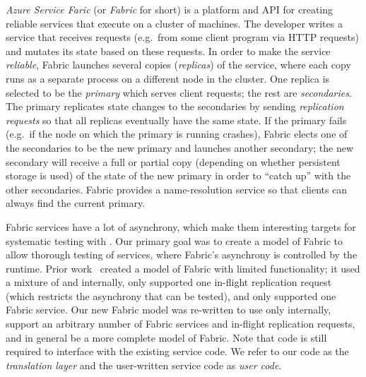 \emph{Azure Service Faric} (or \emph{Fabric} for short) is a platform and API for creating reliable services that execute on a cluster of machines. The developer writes a service that receives requests (e.g.\ from some client program via HTTP requests) and mutates its state based on these requests. In order to make the service \emph{reliable}, Fabric launches several copies (\emph{replicas}) of the service, where each copy runs as a separate process on a different node in the cluster. One replica is selected to be the \emph{primary} which serves client requests; the rest are \emph{secondaries}. The primary replicates state changes to the secondaries by sending \emph{replication requests} so that all replicas eventually have the same state. If the primary fails (e.g.\ if the node on which the primary is running crashes), Fabric elects one of the secondaries to be the new primary and launches another secondary; the new secondary will receive a full or partial copy (depending on whether persistent storage is used) of the state of the new primary in order to ``catch up'' with the other secondaries. Fabric provides a name-resolution service so that clients can always find the current primary. 

Fabric services have a lot of asynchrony, which make them interesting targets for systematic testing with \psharp{}.
Our primary goal was to create a \psharp{} model of Fabric to allow
thorough testing of services, where Fabric's asynchrony is controlled 
by the \psharp{} runtime.
Prior work~\cite{deligiannis2015psharp}
created a model of Fabric with limited functionality;
it used a mixture of \csharp{} and \psharp{} internally,
only supported one in-flight replication request
(which restricts the asynchrony that can be tested),
and only supported one Fabric service.
Our new Fabric model was re-written to use only \psharp{}
internally,
support an arbitrary number of Fabric services and in-flight replication requests,
and in general be a more complete model of Fabric.
Note that \csharp{} code is still required to interface with the existing
\csharp{} service code.
We refer to our \csharp{} code
as the \emph{translation layer}
and
 the user-written \csharp{} service code as \emph{user code}. 

